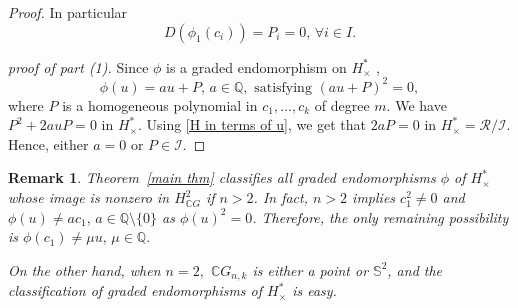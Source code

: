 \documentclass{amsart}
\newtheorem{remark}[theorem]{Remark}
\newcommand{\thmref}[1]{Theorem~\ref{#1}}
\begin{document}
\begin{proof}
In particular $$D(\phi_1(c_i))=P_i=0, \, \forall i \in I.$$
		
		\textit{proof of part (1).} Since %
$\phi$ is a graded endomorphism on $H^*_{\times}$%
,  $$\phi(u) = a u + P, \, a \in \mathbb{Q}, \text{ satisfying } (a u + P)^2 =0,$$ where %
$P$ is a homogeneous polynomial in $c_1, \dots, c_k$ of degree $m$. We have $P^2 + 2 a u P =0$ in $H^*_{\times}$. Using \eqref{H in terms of u}, we get that $2aP =0$ in $H^*_{\times}=\mathcal{R}/\mathcal{I}$. Hence, either $a=0$ or $P\in \mathcal{I}$.
	\end{proof}
	
	
		\begin{remark}
			\thmref{main thm} classifies all graded endomorphisms $\phi$ of $H^*_\times$ whose image is nonzero in $H^2_{\mathbb CG}$ if $n>2$. In fact, $n>2$ implies $c_1^2\neq 0$ and $\phi(u) \neq ac_1,\, a \in \mathbb{Q}\setminus\{0\}$ as $\phi(u)^2=0$. Therefore, the only remaining possibility is $\phi(c_1)\neq \mu u,\, \mu \in \mathbb Q.$ 
			
			On the other hand, when $n=2,$ $\mathbb CG_{n,k}$ is either a point %
or $\mathbb S^2$, and %
the classification of graded endomorphisms of $H^*_\times$ is easy.
		\end{remark}
	
\end{document}
